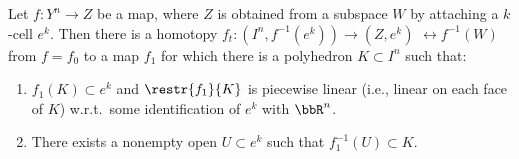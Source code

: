 \begin{lem}\label{lem 4.10 hatcher}
    Let $f:Y^n\to Z$ be a map, where $Z$ is obtained from a subspace $W$ by attaching a $k$-cell $e^k$. Then there is a homotopy $f_t:(I^n,f^{-1}(e^k))\to (Z,e^k)$ $\rel f^{-1}(W)$ from $f=f_0$ to a map $f_1$ for which there is a polyhedron $K\subset I^n$ such that:
    \begin{enumerate}[label=(\alph*)]
        \item $f_1(K)\subset e^k$ and $\restr{f_1}{K}$ is piecewise linear (i.e., linear on each face of $K$) w.r.t.\ some identification of $e^k$ with $\bbR^n$.
        \item There exists a nonempty open $U\subset e^k$ such that $f_1^{-1}(U)\subset K$.
    \end{enumerate}
\end{lem}
